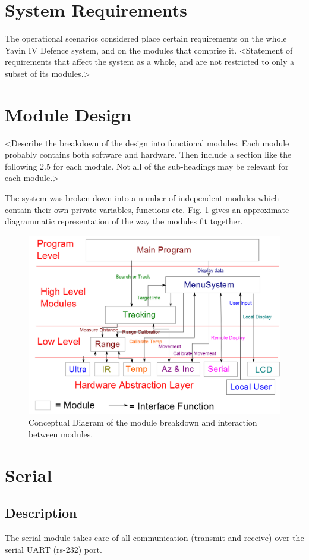 \documentclass[]{report}
\begin{document}
\section{System Requirements}
The operational scenarios considered place certain requirements on the whole Yavin IV Defence system, and on the modules that comprise it.
<Statement of requirements that affect the system as a whole, and are not restricted to only a subset of its modules.>

\section{Module Design}
<Describe the breakdown of the design into functional modules. Each module probably contains both software and hardware.
Then include a section like the following 2.5 for each module. Not all of the sub-headings may be relevant for each module.>

The system was broken down into a number of independent modules which contain their own private variables, functions etc. Fig. \ref{fig:Modules} gives an approximate diagrammatic representation of the way the modules fit together.

\begin{figure}
\centering
\includegraphics[width=0.7\linewidth]{../Diagrams/Modules}
\caption[Modules]{Conceptual Diagram of the module breakdown and interaction between modules.}
\label{fig:Modules}
\end{figure}

\section{Serial}
\subsection{Description}
The serial module takes care of all communication (transmit and receive) over the serial UART (rs-232) port.
\end{document}
